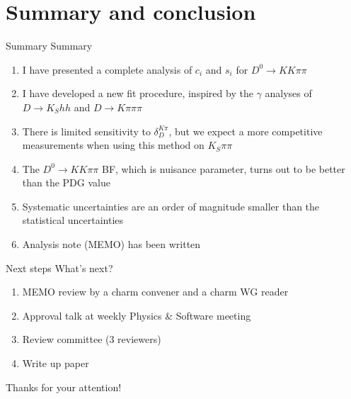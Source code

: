 \documentclass{beamer}
\begin{document}
\section{Summary and conclusion}
\begin{frame}{Summary}
  \vspace{0.0cm}
  {\Large{Summary}}
  \begin{enumerate}
    \setlength\itemsep{1.0em}
    \item{I have presented a complete analysis of $c_i$ and $s_i$ for $D^0\to KK\pi\pi$}
    \item{I have developed a new fit procedure, inspired by the $\gamma$ analyses of $D\to K_Shh$ and $D\to K\pi\pi\pi$}
    \item{There is limited sensitivity to $\delta_D^{K\pi}$, but we expect a more competitive measurements when using this method on $K_S\pi\pi$}
    \item{The $D^0\to KK\pi\pi$ BF, which is nuisance parameter, turns out to be better than the PDG value}
    \item{Systematic uncertainties are an order of magnitude smaller than the statistical uncertainties}
    \item{Analysis note (MEMO) has been written}
  \end{enumerate}
\end{frame}

\begin{frame}{Next steps}
  \vspace{0.0cm}
  {\Large{What's next?}}
  \vspace{0.2cm}
  \begin{enumerate}
    \setlength\itemsep{1.0em}
    \item{MEMO review by a charm convener and a charm WG reader}
    \item{Approval talk at weekly Physics \& Software meeting}
    \item{Review committee (3 reviewers)}
    \item{Write up paper}
  \end{enumerate}
  \vspace{1.0cm}
  \begin{center}
    {\huge Thanks for your attention!}
  \end{center}
\end{frame}
\end{document}
